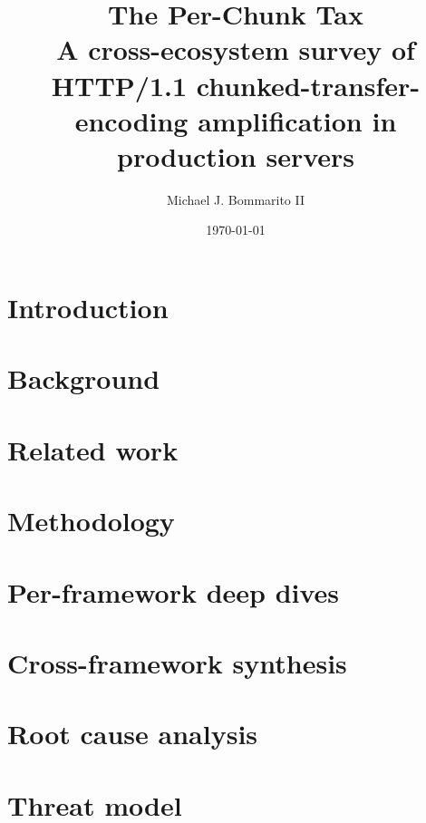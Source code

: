 \documentclass[11pt,letterpaper]{article}
\title{\textbf{The Per-Chunk Tax}\\\large A cross-ecosystem survey of HTTP/1.1 chunked-transfer-encoding amplification in production servers}
\author{Michael J. Bommarito II}
\date{\today}
\begin{document}
\maketitle

\begin{abstract}

\end{abstract}

\section{Introduction}\label{sec:intro}


\section{Background}\label{sec:background}


\section{Related work}\label{sec:related}


\section{Methodology}\label{sec:methodology}


\section{Per-framework deep dives}\label{sec:perframework}


\section{Cross-framework synthesis}\label{sec:synthesis}


\section{Root cause analysis}\label{sec:rootcause}


\section{Threat model}\label{sec:threat}

\end{document}
